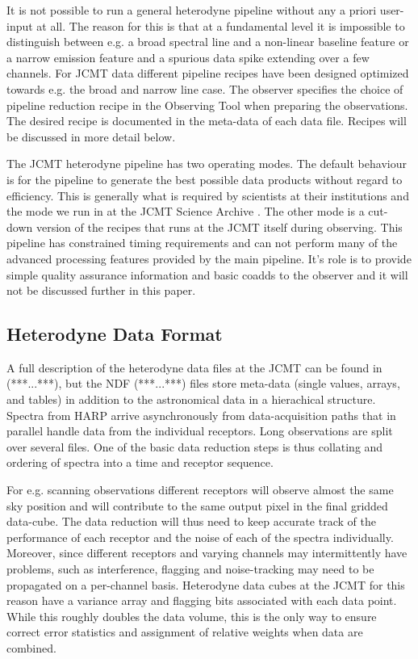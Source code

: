 \documentclass[final,authoryear,5p,times,twocolumn]{elsarticle}
\begin{document}
It is not possible to run a general heterodyne pipeline without any a
priori user-input at all. The reason for this is that at a fundamental
level it is impossible to distinguish between e.g. a broad spectral
line and a non-linear baseline feature or a narrow emission feature
and a spurious data spike extending over a few channels. For JCMT data
different pipeline recipes have been designed optimized towards
e.g. the broad and narrow line case. The observer specifies the choice
of pipeline reduction recipe in the Observing Tool when preparing the
observations. The desired recipe is documented in the meta-data of
each data file. Recipes will be discussed in more detail below.

The JCMT heterodyne pipeline has two operating modes. The default
behaviour is for the pipeline to generate the best possible data
products without regard to efficiency. This is generally what is
required by scientists at their institutions and the mode we run in at
the JCMT Science Archive
\citep{2008ASPC..394..135G,2008ASPC..394..565J}. The other mode is a
cut-down version of the recipes that runs at the JCMT itself during
observing. This pipeline has constrained timing requirements and can
not perform many of the advanced processing features provided by the
main pipeline. It's role is to provide simple quality assurance
information and basic coadds to the observer and it will not be
discussed further in this paper.


\subsection{Heterodyne Data Format}
\label{sec:format}

A full description of the heterodyne data files at the JCMT can be
found in (***...***), but the NDF (***...***) files store meta-data
(single values, arrays, and tables) in addition to the astronomical
data in a hierachical structure. Spectra from HARP arrive
asynchronously from data-acquisition paths that in parallel handle
data from the individual receptors. Long observations are split
over several files. One of the basic data reduction steps is thus
collating and ordering of spectra into a time and receptor sequence.

For e.g. scanning observations different receptors will observe almost
the same sky position and will contribute to the same output pixel in
the final gridded data-cube. The data reduction will thus need to keep
accurate track of the performance of each receptor and the noise of
each of the spectra individually. Moreover, since different receptors
and varying channels may intermittently have problems, such as
interference, flagging and noise-tracking may need to be propagated on a
per-channel basis. Heterodyne data cubes at the JCMT for this reason
have a variance array and flagging bits associated with each data point.
While this roughly doubles the data volume, this is the only way to
ensure correct error statistics and assignment of relative weights
when data are combined.
\end{document}
